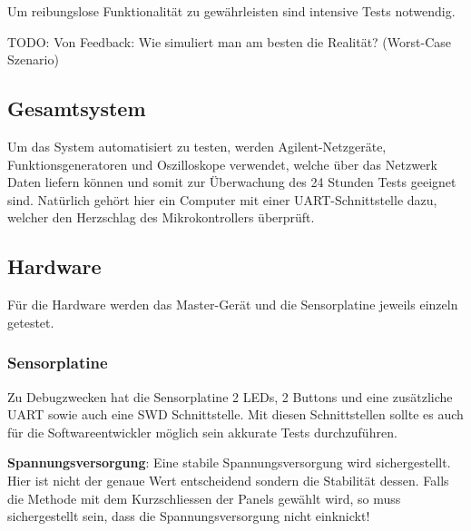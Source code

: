 Um  reibungslose  Funktionalit\"at  zu gew\"ahrleisten  sind  intensive  Tests
notwendig.

\textsc{TODO}: Von  Feedback: Wie  simuliert  man am  besten  die  Realit\"at?
(Worst-Case Szenario)


\subsection{Gesamtsystem}

Um   das  System   automatisiert  zu   testen,  werden   Agilent-Netzger\"ate,
Funktionsgeneratoren und  Oszilloskope verwendet,  welche \"uber  das Netzwerk
Daten  liefern   k\"onnen  und   somit  zur   \"Uberwachung  des   24  Stunden
Tests  geeignet  sind. Nat\"urlich  geh\"ort   hier  ein  Computer  mit  einer
UART-Schnittstelle   dazu,  welcher   den   Herzschlag  des   Mikrokontrollers
\"uberpr\"uft.

\subsection{Hardware}

F\"ur die  Hardware werden  das Master-Ger\"at  und die  Sensorplatine jeweils
einzeln getestet.

\subsubsection{Sensorplatine}

Zu Debugzwecken hat die Sensorplatine 2 LEDs, 2 Buttons und eine zus\"atzliche
UART  sowie  auch eine  SWD  Schnittstelle. Mit  diesen Schnittstellen  sollte
es   auch  f\"ur   die  Softwareentwickler   m\"oglich  sein   akkurate  Tests
durchzuf\"uhren.

\textbf{Spannungsversorgung}: Eine     stabile    Spannungsversorgung     wird
sichergestellt. Hier  ist  nicht  der  genaue Wert  entscheidend  sondern  die
Stabilit\"at  dessen. Falls  die Methode  mit  dem  Kurzschliessen der  Panels
gew\"ahlt  wird, so  muss  sichergestellt sein,  dass die  Spannungsversorgung
nicht einknickt!

